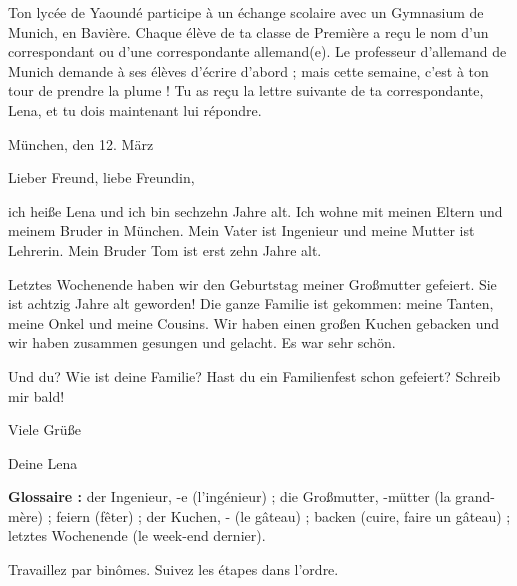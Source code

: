 \documentclass[11pt]{article}
\newcounter{popsec}
\newcounter{popsub}
\newcommand{\courssub}[1]{%
  \stepcounter{popsub}%
  \par\vspace{9pt}\noindent{\popxbold\fontsize{11.5}{13}\selectfont\color{popink}{\color{poporange}\thepopsec.\thepopsub}\hspace{6pt}#1}\par\nopagebreak\vspace{4pt}
}
\begin{document}
Ton lycée de Yaoundé participe à un échange scolaire avec un Gymnasium de Munich, en Bavière. Chaque élève de ta classe de Première a reçu le nom d'un correspondant ou d'une correspondante allemand(e). Le professeur d'allemand de Munich demande à ses élèves d'écrire d'abord ; mais cette semaine, c'est à ton tour de prendre la plume ! Tu as reçu la lettre suivante de ta correspondante, Lena, et tu dois maintenant lui répondre.

\begin{textebox}
München, den 12. März\par
\medskip
Lieber Freund, liebe Freundin,\par
\medskip
ich heiße Lena und ich bin sechzehn Jahre alt. Ich wohne mit meinen Eltern und meinem Bruder in München. Mein Vater ist Ingenieur und meine Mutter ist Lehrerin. Mein Bruder Tom ist erst zehn Jahre alt.\par
\medskip
Letztes Wochenende haben wir den Geburtstag meiner Großmutter gefeiert. Sie ist achtzig Jahre alt geworden! Die ganze Familie ist gekommen: meine Tanten, meine Onkel und meine Cousins. Wir haben einen großen Kuchen gebacken und wir haben zusammen gesungen und gelacht. Es war sehr schön.\par
\medskip
Und du? Wie ist deine Familie? Hast du ein Familienfest schon gefeiert? Schreib mir bald!\par
\medskip
Viele Grüße\par
Deine Lena
\end{textebox}

\textbf{Glossaire :} der Ingenieur, -e (l'ingénieur) ; die Großmutter, -mütter (la grand-mère) ; feiern (fêter) ; der Kuchen, - (le gâteau) ; backen (cuire, faire un gâteau) ; letztes Wochenende (le week-end dernier).

\courssub{Consignes}

Travaillez par binômes. Suivez les étapes dans l'ordre.
\end{document}
